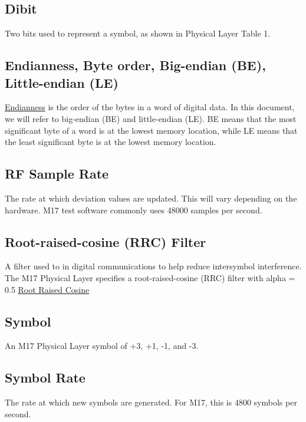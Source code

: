 \documentclass[a4paper,11pt]{book}
\begin{document}
\subsection{Dibit}

Two bits used to represent a symbol, as shown in Physical Layer Table 1.

\subsection{Endianness, Byte order, Big-endian (BE), Little-endian (LE)}

\href{https://en.wikipedia.org/wiki/Endianness}{Endianness} is the order of the bytes in a word of digital data. In this document, we will refer to big-endian (BE) and little-endian (LE). BE means that the most significant byte of a word is at the lowest memory location, while LE means that the least significant byte is at the lowest memory location.

\subsection{RF Sample Rate}

The rate at which deviation values are updated. This will vary depending on the hardware. M17 test software commonly uses 48000 samples per second.

\subsection{Root-raised-cosine (RRC) Filter}

A filter used to in digital communications to help reduce intersymbol interference. The M17 Physical Layer specifies a root-raised-cosine (RRC) filter with alpha = 0.5 \href{https://en.wikipedia.org/wiki/Root-raised-cosine_filter}{Root
Raised Cosine}

\subsection{Symbol}

An M17 Physical Layer symbol of +3, +1, -1, and -3.

\subsection{Symbol Rate}

The rate at which new symbols are generated. For M17, this is 4800 symbols per second.
\end{document}

